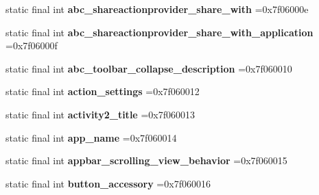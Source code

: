 \begin{DoxyCompactItemize}
\item 
\hypertarget{classcheck_1_1test_1_1_r_1_1string_ad0e226d2671f310f311d7579a073e257}{}static final int {\bfseries abc\+\_\+shareactionprovider\+\_\+share\+\_\+with} =0x7f06000e\label{classcheck_1_1test_1_1_r_1_1string_ad0e226d2671f310f311d7579a073e257}

\item 
\hypertarget{classcheck_1_1test_1_1_r_1_1string_ad39b5416c42f054f1d913d6330e3131a}{}static final int {\bfseries abc\+\_\+shareactionprovider\+\_\+share\+\_\+with\+\_\+application} =0x7f06000f\label{classcheck_1_1test_1_1_r_1_1string_ad39b5416c42f054f1d913d6330e3131a}

\item 
\hypertarget{classcheck_1_1test_1_1_r_1_1string_a759f9f7b254e87a166ed6e0892594d7e}{}static final int {\bfseries abc\+\_\+toolbar\+\_\+collapse\+\_\+description} =0x7f060010\label{classcheck_1_1test_1_1_r_1_1string_a759f9f7b254e87a166ed6e0892594d7e}

\item 
\hypertarget{classcheck_1_1test_1_1_r_1_1string_a051cc9f3f54bce9fa8b5d17f6a3b20b6}{}static final int {\bfseries action\+\_\+settings} =0x7f060012\label{classcheck_1_1test_1_1_r_1_1string_a051cc9f3f54bce9fa8b5d17f6a3b20b6}

\item 
\hypertarget{classcheck_1_1test_1_1_r_1_1string_a8fcabd9976e3f0efa6f3589dcf949aa7}{}static final int {\bfseries activity2\+\_\+title} =0x7f060013\label{classcheck_1_1test_1_1_r_1_1string_a8fcabd9976e3f0efa6f3589dcf949aa7}

\item 
\hypertarget{classcheck_1_1test_1_1_r_1_1string_ae462705a290824a117c2bc0918e431a4}{}static final int {\bfseries app\+\_\+name} =0x7f060014\label{classcheck_1_1test_1_1_r_1_1string_ae462705a290824a117c2bc0918e431a4}

\item 
\hypertarget{classcheck_1_1test_1_1_r_1_1string_a7d0f5592dc79602be92c9c031e2ea10a}{}static final int {\bfseries appbar\+\_\+scrolling\+\_\+view\+\_\+behavior} =0x7f060015\label{classcheck_1_1test_1_1_r_1_1string_a7d0f5592dc79602be92c9c031e2ea10a}

\item 
\hypertarget{classcheck_1_1test_1_1_r_1_1string_a55c948adb2c62fc0a3a8cd49ac476b83}{}static final int {\bfseries button\+\_\+accessory} =0x7f060016\label{classcheck_1_1test_1_1_r_1_1string_a55c948adb2c62fc0a3a8cd49ac476b83}


\end{DoxyCompactItemize}
